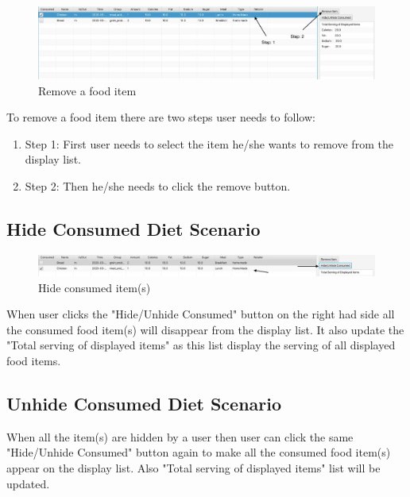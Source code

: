 \documentclass{scrreprt}
\begin{document}
\begin{figure}[!htbp]
\centering
\includegraphics[width=15cm]{pictures/remove-food.png}
\caption*{Remove a food item}
\end{figure}

\FloatBarrier

To remove a food item there are two steps user needs to follow:

\begin{enumerate}
\item Step 1: First user needs to select the item he/she wants to remove from the display list.
\item Step 2: Then he/she needs to click the remove button.
\end{enumerate}

\subsection{Hide Consumed Diet Scenario}

\begin{figure}[!htbp]
\centering
\includegraphics[width=15cm]{pictures/hide.png}
\caption*{Hide consumed item(s)}
\end{figure}

\FloatBarrier

When user clicks the "Hide/Unhide Consumed" button on the right had side all the consumed food item(s) will disappear from the display list. It also update the "Total serving of displayed items" as this list display the serving of all displayed food items.

\subsection{Unhide Consumed Diet Scenario}

When all the item(s) are hidden by a user then user can click the same "Hide/Unhide Consumed" button again to make all the consumed food item(s) appear on the display list. Also "Total serving of displayed items" list will be updated.
\end{document}
